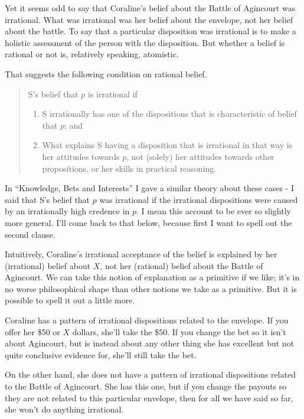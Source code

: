 \documentclass[11pt,]{book}
\providecommand{\tightlist}{%
  \setlength{\itemsep}{0pt}\setlength{\parskip}{0pt}}
\begin{document}
Yet it seems odd to say that Coraline's belief about the Battle of Agincourt was irrational. What was irrational was her belief about the envelope, not her belief about the battle. To say that a particular disposition was irrational is to make a holistic assessment of the person with the disposition. But whether a belief is rational or not is, relatively speaking, atomistic.

That suggests the following condition on rational belief.

\begin{quote}
S's belief that \(p\) is irrational if

\begin{enumerate}
\def\labelenumi{\arabic{enumi}.}
\tightlist
\item
  S irrationally has one of the dispositions that is characteristic of belief that \(p\); and
\item
  What explains S having a disposition that is irrational in that way is her attitudes towards \(p\), not (solely) her attitudes towards other propositions, or her skills in practical reasoning.
\end{enumerate}
\end{quote}

In ``Knowledge, Bets and Interests'' I gave a similar theory about these cases - I said that S's belief that \(p\) was irrational if the irrational dispositions were caused by an irrationally high credence in \(p\). I mean this account to be ever so slightly more general. I'll come back to that below, because first I want to spell out the second clause.

Intuitively, Coraline's irrational acceptance of the belief is explained by her (irrational) belief about \(X\), not her (rational) belief about the Battle of Agincourt. We can take this notion of explanation as a primitive if we like; it's in no worse philosophical shape than other notions we take as a primitive. But it is possible to spell it out a little more.

Coraline has a pattern of irrational dispositions related to the envelope. If you offer her \$50 or \(X\) dollars, she'll take the \$50. If you change the bet so it isn't about Agincourt, but is instead about any other thing she has excellent but not quite conclusive evidence for, she'll still take the bet.

On the other hand, she does not have a pattern of irrational dispositions related to the Battle of Agincourt. She has this one, but if you change the payouts so they are not related to this particular envelope, then for all we have said so far, she won't do anything irrational.
\end{document}
